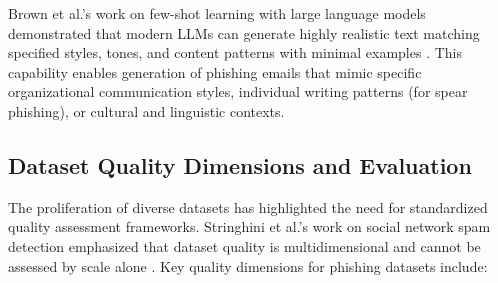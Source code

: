 Brown et al.'s work on few-shot learning with large language models demonstrated that modern \acp{LLM} can generate highly realistic text matching specified styles, tones, and content patterns with minimal examples \cite{brown2020language}. This capability enables generation of phishing emails that mimic specific organizational communication styles, individual writing patterns (for spear phishing), or cultural and linguistic contexts.

\subsection{Dataset Quality Dimensions and Evaluation}

The proliferation of diverse datasets has highlighted the need for standardized quality assessment frameworks. Stringhini et al.'s work on social network spam detection emphasized that dataset quality is multidimensional and cannot be assessed by scale alone \cite{stringhini2010detecting}. Key quality dimensions for phishing datasets include:

